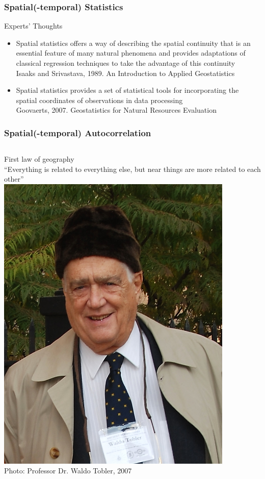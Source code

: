 \documentclass{beamer}
\begin{document}
\begin{frame}
\frametitle{Spatial(-temporal) Statistics}
\begin{block}{Experts’ Thoughts}
\begin{itemize}
\item Spatial statistics offers a way of describing the spatial continuity that is an essential feature of many natural phenomena and provides adaptations of classical regression techniques to take the advantage of this continuity\\
\small \alert{Isaaks and Srivastava, 1989. An Introduction to Applied Geostatistics}
\normalsize
\vspace{1cm}
\item Spatial statistics provides a set of statistical tools for incorporating the spatial coordinates of observations in data processing\\
\small \alert{Goovaerts, 2007. Geostatistics for Natural Resources Evaluation}
\end{itemize}
\end{block}
\end{frame}


\begin{frame}
\frametitle{Spatial(-temporal) Autocorrelation}
\begin{columns}
\alert{First law of geography}\\[0.5cm]
``Everything is related to everything else, but near things are more related to each other''\\
\hspace{2cm}
\raggedleft
\includegraphics[width=0.85\textwidth]{Figures/Tobler_2007.png}\\
\tiny Photo: Professor Dr. Waldo Tobler, 2007
\end{columns}
\end{frame}
\end{document}
